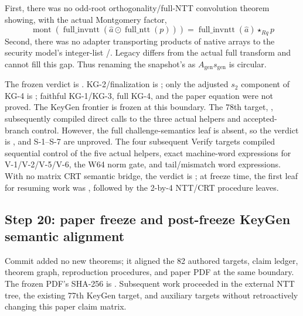 \begin{boundary}
First, there was no odd-root orthogonality/full-NTT convolution theorem showing,
with the actual Montgomery factor,
\[
 \operatorname{mont}
  (\operatorname{full\_invntt}(\widehat a\odot\operatorname{full\_ntt}(p)))
 =\operatorname{full\_invntt}(\widehat a)\mathbin{\star_{\!Rq}}p
\]
Second, there was no adapter transporting products of native 
arrays to the security model's integer-list
/. Legacy 
differs from the actual full transform and cannot fill this gap. Thus renaming
the snapshot's  as
\(A_{\mathrm{gen}}s_{\mathrm{gen}}\) is circular.
\end{boundary}

The frozen verdict is . KG-2/finalization is
\statusproved; only the adjusted \(s_2\) component of KG-4 is \statusproved;
faithful KG-1/KG-3, full KG-4, and the paper equation were not proved. The KeyGen
frontier is frozen at this boundary. The 78th target,
, subsequently compiled direct calls to the
three actual helpers and accepted-branch control. However, the full
challenge-semantics leaf is absent, so the verdict is
, and S-1--S-7 are unproved. The four subsequent
Verify targets compiled sequential control of the five actual helpers, exact
machine-word expressions for V-1/V-2/V-5/V-6, the W64 norm gate, and tail/mismatch
word expressions. With no matrix CRT semantic bridge, the verdict is
; at freeze time, the first leaf for resuming
work was , followed by the 2-by-4 NTT/CRT
procedure leaves.

\subsection{Step 20: paper freeze and post-freeze KeyGen semantic alignment}
\label{subsec:post-freeze-keygen}

Commit  added no new
theorems; it aligned the 82 authored targets, claim ledger, theorem graph,
reproduction procedures, and paper PDF at the same 
boundary. The frozen PDF's SHA-256 is
.
Subsequent work proceeded in the external NTT tree, the existing 77th KeyGen
target, and  auxiliary targets without retroactively
changing this paper claim matrix.

